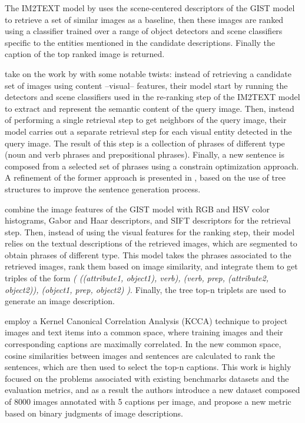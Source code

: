 The IM2TEXT model by \citet{Ordonez2011} uses the scene-centered descriptors of the GIST model \citep{Oliva2006, Torralba2008} to retrieve a set of similar images as a baseline, then these images are ranked using a classifier trained over a range of object detectors and scene classifiers specific to the entities mentioned in the candidate descriptions. Finally the caption of the top ranked image is returned. 

\citet{Kuznetsova2012} take on the work by \citet{Ordonez2011} with some notable twists: instead of retrieving a candidate set of images using content --visual-- features, their model start by running the detectors and scene classifiers used in the re-ranking step of the IM2TEXT model to extract and represent the semantic content of the query image. Then, instead of performing a single retrieval step to get neighbors of the query image, their model carries out a separate retrieval step for each visual entity detected in the query image. The result of this step is a collection of phrases of different type (noun and verb phrases and prepositional phrases). Finally, a new sentence is composed from a selected set of phrases using a constrain optimization approach. A refinement of the former approach is presented in \citet{Kuznetsova2014}, based on the use of tree structures to improve the sentence generation process.

\citet{Gupta2012} combine the image features of the GIST model with RGB and HSV color histograms, Gabor and Haar descriptors, and SIFT \citep{Lowe2004} descriptors for the retrieval step. Then, instead of using the visual features for the ranking step, their model relies on the textual descriptions of the retrieved images, which are segmented to obtain phrases of different type. This model takes the phrases associated to the retrieved images, rank them based on image similarity, and integrate them to get triples of the form \textit{( ((attribute1, object1), verb), (verb, prep, (attribute2, object2)), (object1, prep, object2) )}. Finally, the tree top-n triplets are used to generate an image description.

\citet{Hodosh2013b} employ a Kernel Canonical Correlation Analysis (KCCA) \citep{Bach2003} technique to project images and text items into a common space, where training images and their corresponding captions are maximally correlated. In the new common space, cosine similarities between images and sentences are calculated to rank the sentences, which are then used to select the top-n captions. This work is highly focused on the problems associated with existing benchmarks datasets and the evaluation metrics, and as a result the authors introduce a new dataset composed of 8000 images annotated with 5 captions per image, and propose a new metric based on binary judgments of image descriptions.

